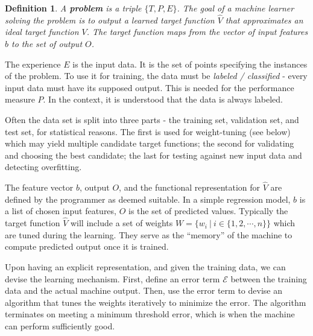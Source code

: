 \documentclass[12pt]{article}  %
\newtheorem{definition}{Definition}
\begin{document}
\begin{definition}
A {\bf \em problem} is a triple $\{T, P, E\}$. The goal of a machine learner solving the problem is to output a learned target function $\hat{V}$ that approximates an ideal target function $V$. The target function maps from the vector of input features $b$ to the set of output $O$.
\end{definition}


The experience $E$ is the input data. It is the set of points specifying the instances of the problem. To use it for training, the data must be {\em labeled / classified} - every input data must have its supposed output. This is needed for the performance measure $P$. In the context, it is understood that the data is always labeled.

Often the data set is split into three parts - the training set, validation set, and test set, for statistical reasons. The first is used for weight-tuning (see below) which may yield multiple candidate target functions; the second for validating and choosing the best candidate; the last for testing against new input data and detecting overfitting. 


The feature vector $b$, output $O$, and the functional representation for $\hat{V}$ are defined by the programmer as deemed suitable. In a simple regression model, $b$ is a list of chosen input features, $O$ is the set of predicted values. Typically the target function $\hat{V}$ will include a set of weights $W = \{w_i \ | \ i \in \{1,2,\cdots,n\}\}$ which are tuned during the learning. They serve as the ``memory'' of the machine to compute predicted output once it is trained.



Upon having an explicit representation, and given the training data, we can devise the learning mechanism. First, define an error term $\mathcal{E}$ between the training data and the actual machine output. Then, use the error term to devise an algorithm that tunes the weights iteratively to minimize the error. The algorithm terminates on meeting a minimum threshold error, which is when the machine can perform sufficiently good.
\end{document}
